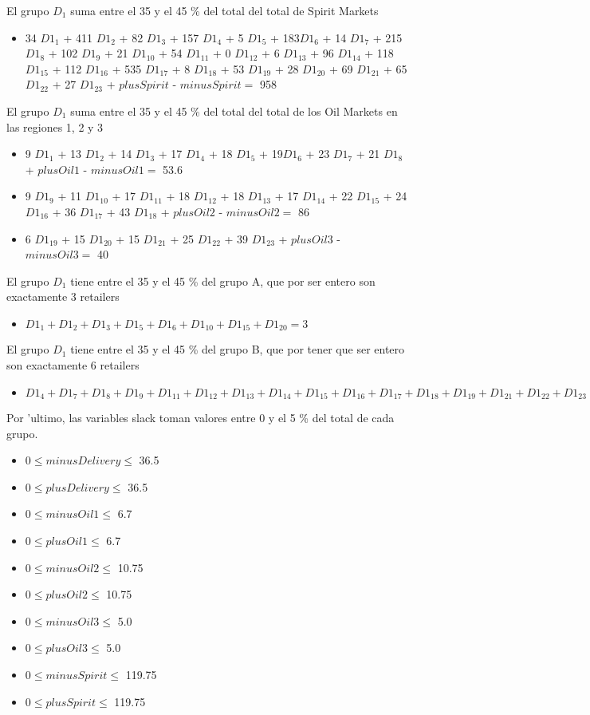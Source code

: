 El grupo $D_1$ suma entre el 35 y el 45 \% del total del total de Spirit Markets
\begin{itemize}
\item 34 ${D1}_1$ + 411 ${D1}_2$ + 82 ${D1}_3$ + 157 ${D1}_4$ + 5 ${D1}_5$ + 183${D1}_6$ + 14 ${D1}_7$ + 215 ${D1}_8$ + 102 ${D1}_9$ + 21 ${D1}_{10}$ + 54 ${D1}_{11}$ + 0 ${D1}_{12}$ + 6 ${D1}_{13}$ + 96 ${D1}_{14}$ + 118 ${D1}_{15}$ + 112 ${D1}_{16}$ + 535 ${D1}_{17}$ + 8 ${D1}_{18}$ + 53 ${D1}_{19}$ + 28 ${D1}_{20}$ + 69 ${D1}_{21}$ + 65 ${D1}_{22}$ + 27 ${D1}_{23}$ + $plusSpirit$ - $minusSpirit = $ 958
\end{itemize}
El grupo $D_1$ suma entre el 35 y el 45 \% del total del total de los Oil Markets en las regiones 1, 2 y 3
\begin{itemize}
\item 9 ${D1}_1$ + 13 ${D1}_2$ + 14 ${D1}_3$ + 17 ${D1}_4$ + 18 ${D1}_5$ + 19${D1}_6$ + 23 ${D1}_7$ + 21 ${D1}_8$ + $plusOil1$ - $minusOil1 = $ 53.6
\item 9 ${D1}_9$ + 11 ${D1}_{10}$ + 17 ${D1}_{11}$ + 18 ${D1}_{12}$ + 18 ${D1}_{13}$ + 17 ${D1}_{14}$ + 22 ${D1}_{15}$ + 24 ${D1}_{16}$ + 36 ${D1}_{17}$ + 43 ${D1}_{18}$ + $plusOil2$ - $minusOil2 = $ 86
\item 6 ${D1}_{19}$ + 15 ${D1}_{20}$ + 15 ${D1}_{21}$ + 25 ${D1}_{22}$ + 39 ${D1}_{23}$ + $plusOil3$ - $minusOil3 = $ 40
\end{itemize}
El grupo $D_1$ tiene entre el 35 y el 45 \% del grupo A, que por ser entero son exactamente 3 retailers
\begin{itemize}
\item ${D1}_1 + {D1}_2 + {D1}_3 + {D1}_5 + {D1}_6 + {D1}_{10} + {D1}_{15} + {D1}_{20} = 3$
\end{itemize}
El grupo $D_1$ tiene entre el 35 y el 45 \% del grupo B, que por tener que ser entero son exactamente 6 retailers
\begin{itemize}
\item ${D1}_4 + {D1}_7 + {D1}_8 + {D1}_9 + {D1}_{11} + {D1}_{12} + {D1}_{13} + {D1}_{14} + {D1}_{15} + {D1}_{16} + {D1}_{17} + {D1}_{18} + {D1}_{19} + {D1}_{21} + {D1}_{22} + {D1}_{23}   = 6$
\end{itemize}
Por 'ultimo, las variables slack toman valores entre 0 y el 5 \% del total de cada grupo.
\begin{itemize}
\item $0 \leq minusDelivery \leq$ 36.5
\item $0 \leq plusDelivery \leq$ 36.5
\item $0 \leq minusOil1 \leq$ 6.7
\item $0 \leq plusOil1 \leq$ 6.7
\item $0 \leq minusOil2 \leq$ 10.75
\item $0 \leq plusOil2 \leq$ 10.75
\item $0 \leq minusOil3 \leq$ 5.0
\item $0 \leq plusOil3 \leq$ 5.0
\item $0 \leq minusSpirit \leq$ 119.75
\item $0 \leq plusSpirit \leq$ 119.75
\end{itemize}
